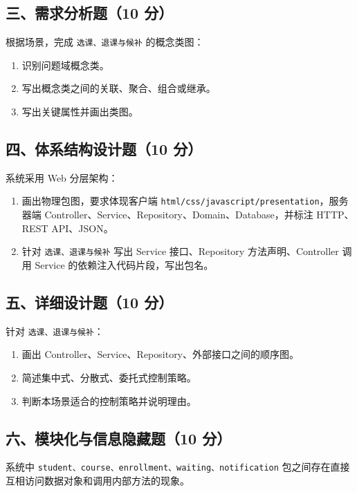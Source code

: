 \documentclass[UTF8,zihao=-4]{ctexart}
\begin{document}
\subsection{三、需求分析题（10 分）}


根据场景，完成 \texttt{选课、退课与候补} 的概念类图：


\begin{enumerate}
\item 识别问题域概念类。
\item 写出概念类之间的关联、聚合、组合或继承。
\item 写出关键属性并画出类图。
\end{enumerate}


\subsection{四、体系结构设计题（10 分）}


系统采用 Web 分层架构：


\begin{enumerate}
\item 画出物理包图，要求体现客户端 \texttt{html/css/javascript/presentation}，服务器端 Controller、Service、Repository、Domain、Database，并标注 HTTP、REST API、JSON。
\item 针对 \texttt{选课、退课与候补} 写出 Service 接口、Repository 方法声明、Controller 调用 Service 的依赖注入代码片段，写出包名。
\end{enumerate}


\subsection{五、详细设计题（10 分）}


针对 \texttt{选课、退课与候补}：


\begin{enumerate}
\item 画出 Controller、Service、Repository、外部接口之间的顺序图。
\item 简述集中式、分散式、委托式控制策略。
\item 判断本场景适合的控制策略并说明理由。
\end{enumerate}


\subsection{六、模块化与信息隐藏题（10 分）}


系统中 \texttt{student、course、enrollment、waiting、notification} 包之间存在直接互相访问数据对象和调用内部方法的现象。
\end{document}
